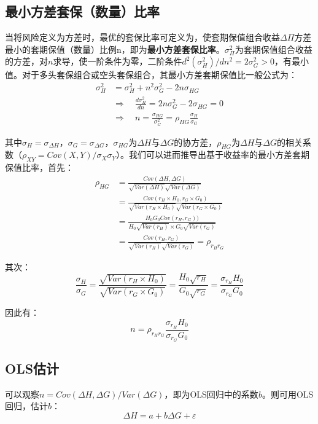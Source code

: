 \documentclass[11pt]{article}
\begin{document}
\subsection{最小方差套保（数量）比率}
当将风险定义为方差时，最优的套保比率可定义为，使套期保值组合收益$\Delta\Pi$方差最小的套期保值（数量）比例n，即为\textbf{最小方差套保比率}。$\sigma_\Pi^2$为套期保值组合收益的方差，对$n$求导，使一阶条件为零，二阶条件$d^2(\sigma_H^2)/dn^2=2\sigma_G^2>0$，有最小值。对于多头套保组合或空头套保组合，其最小方差套期保值比一般公式为：
\begin{align*}
    \sigma_{\Pi}^2 &= \sigma_H^2 + n^2\sigma_G^2 - 2n\sigma_{HG}\\
    &\Rightarrow \quad \frac{d\sigma_\Pi^2}{dn} = 2n\sigma_G^2 - 2\sigma_{HG} = 0 \\
    &\Rightarrow \quad n = \frac{\sigma_{HG}}{\sigma_G^2} =\rho_{HG} \frac{\sigma_H}{\sigma_G}
\end{align*}

其中$\sigma_H = \sigma_{\Delta H}$，$\sigma_G = \sigma_{\Delta G}$，$\sigma_{HG}$为$\Delta H$与$\Delta G$的协方差，$\rho_{HG}$为$\Delta H$与$\Delta G$的相关系数（$\rho_{XY} = Cov(X,Y)/\sigma_X\sigma_Y$）。我们可以进而推导出基于收益率的最小方差套期保值比率，首先：
\begin{align*}
    \rho_{HG} &= \frac{Cov(\Delta H,\Delta G)}{\sqrt{Var(\Delta H)} \sqrt{Var(\Delta G)}} \\
    &= \frac{Cov(r_H \times H_0,r_G \times G_0)}{\sqrt{Var(r_H \times H_0)} \sqrt{Var(r_G \times G_0)}}\\
    &= \frac{H_0 G_0 Cov(r_H,r_G))}{H_0 \sqrt{Var(r_H)} \times G_0 \sqrt{Var(r_G)}} \\
    &= \frac{Cov(r_H,r_G)}{\sqrt{Var(r_H)} \sqrt{Var(r_G)}} = \rho_{r_H r_G}
\end{align*}

其次：
\begin{equation*}
    \frac{\sigma_H}{\sigma_G} =  \frac{\sqrt{Var(r_H \times H_0)}}{\sqrt{Var(r_G \times G_0)}} = \frac{H_0 \sqrt{r_H}}{G_0 \sqrt{r_G}} = \frac{\sigma_{r_H} H_0}{\sigma_{r_G} G_0}
\end{equation*}

因此有：
\begin{equation*}
    n = \rho_{r_H r_G}\frac{\sigma_{r_H} H_0}{\sigma_{r_G} G_0}
\end{equation*}


\subsection{OLS估计}
可以观察$n = Cov(\Delta H,\Delta G)/Var(\Delta G)，$即为OLS回归中的系数$b$。则可用OLS回归，估计$b$：
\begin{equation*}
    \Delta H = a + b\Delta G + \varepsilon
\end{equation*}
\end{document}
